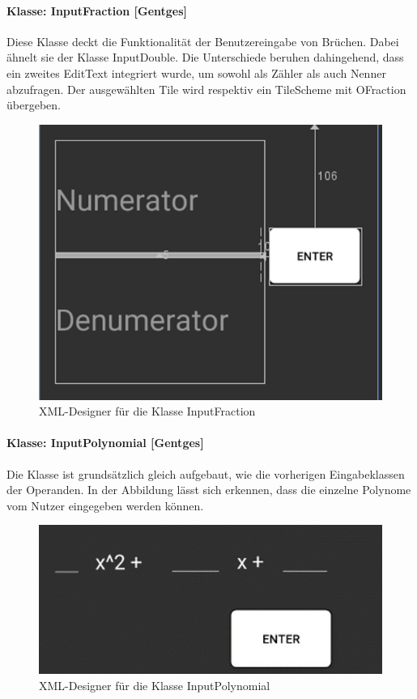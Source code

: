 \paragraph{Klasse: InputFraction [Gentges]}

Diese Klasse deckt die Funktionalität der Benutzereingabe von Brüchen. Dabei ähnelt sie der Klasse InputDouble. Die Unterschiede beruhen dahingehend, dass ein zweites EditText integriert wurde, um sowohl als Zähler als auch Nenner abzufragen. Der ausgewählten Tile wird respektiv ein TileScheme mit OFraction übergeben. 

\begin{figure}[h]
	\includegraphics[width=\columnwidth]{img/xml_InputFraction}
	\caption[XML-Designer für die Klasse InputFraction]{XML-Designer für die Klasse InputFraction\footnotemark}
\end{figure}

\paragraph{Klasse: InputPolynomial [Gentges]}

Die Klasse ist grundsätzlich gleich aufgebaut, wie die vorherigen Eingabeklassen der Operanden. In der Abbildung lässt sich erkennen, dass die einzelne Polynome vom Nutzer eingegeben werden können.

\begin{figure}[h]
	\includegraphics[width=\columnwidth]{img/xml_InputPolynomial}
	\caption[XML-Designer für die Klasse InputPolynomial]{XML-Designer für die Klasse InputPolynomial\footnotemark}
\end{figure}

